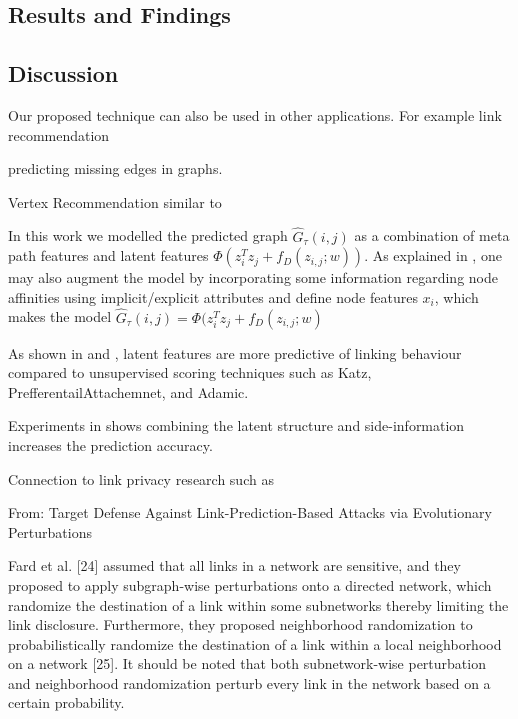 \subsection{Results and Findings}



\subsection{Discussion}



Our proposed technique can also be used in other applications. For example link recommendation 


predicting missing edges in graphs.

Vertex Recommendation similar to \cite{ou2016asymmetric} 


In this work we modelled the predicted graph $ \hat{G}_\tau(i,j)$ as a combination of meta path features and latent features $\Phi(z_{i}^Tz_{j} + f_D(z_{i,j};w))$. As explained in \cite{menon2011link}, one may also augment the model by incorporating some information regarding node affinities using implicit/explicit attributes and define node features $x_i$, which makes the model $\hat{G}_\tau(i,j) = \Phi(z_{i}^Tz_{j} + f_D(z_{i,j};w)$

As shown in \cite{menon2011link} and \cite{Zhu2016}, latent features are more predictive of linking behaviour compared to unsupervised scoring techniques such as Katz, PrefferentailAttachemnet, and Adamic.

Experiments in \cite{menon2011link} shows combining the latent structure and side-information increases the prediction accuracy.


Connection to link privacy research such as \cite{amin:wwwj}

From: Target Defense Against Link-Prediction-Based Attacks via Evolutionary Perturbations

Fard et al. [24] assumed that all links in a network are sensitive, and they proposed to apply subgraph-wise perturbations onto a directed network, which randomize the destination of a link within some subnetworks thereby limiting the link disclosure. Furthermore, they proposed neighborhood randomization to probabilistically randomize the destination of a link within a local neighborhood on a network [25]. It should be noted that both subnetwork-wise perturbation and neighborhood randomization perturb every link in the network based on a certain probability.

